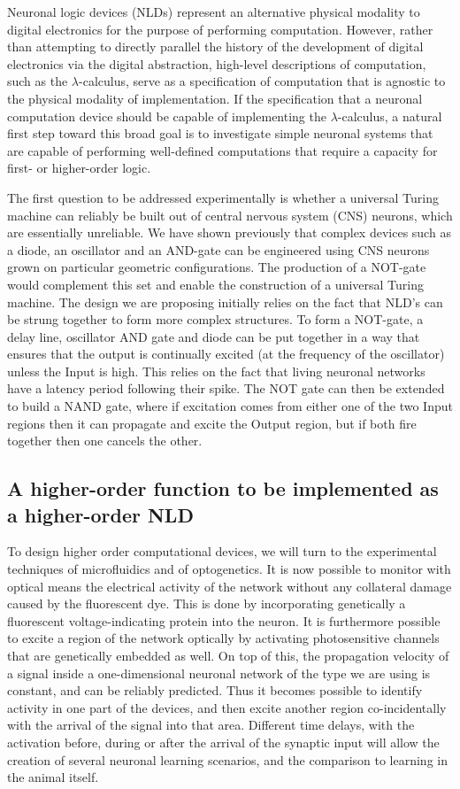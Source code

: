 Neuronal logic devices (NLDs) represent an alternative physical modality
to digital electronics for the purpose of performing computation.
However, rather than attempting to directly parallel the history of the
development of digital electronics via the digital abstraction,
high-level descriptions of computation, such as the
$\lambda$-calculus, serve as a specification
of computation that is agnostic to the physical modality of
implementation. If the specification that a neuronal computation device
should be capable of implementing the
$\lambda$-calculus, a natural first step
toward this broad goal is to investigate simple neuronal systems that
are capable of performing well-defined computations that require a
capacity for first- or higher-order logic.

The first question to be addressed experimentally is whether a universal Turing machine can reliably be built out of central nervous system (CNS) neurons, which are essentially unreliable. We have shown previously that complex devices such as a diode, an oscillator and an AND-gate can be engineered using CNS neurons grown on particular geometric configurations. The production of a NOT-gate would complement this set and enable the construction of a universal Turing machine.
The design we are proposing initially relies on the fact that NLD's can be strung together to form more complex structures. To form a NOT-gate, a delay line, oscillator AND gate and diode can be put together in a way that ensures that the output is continually excited (at the frequency of the oscillator) unless the Input is high. This relies on the fact that living neuronal networks have a latency period following their spike. The NOT gate can then be extended to build a NAND gate, where if excitation comes from either one of the two Input regions then it can propagate and excite the Output region, but if both fire together then one cancels the other.


\subsection{A higher-order function to be implemented as a higher-order
NLD}

To design higher order computational devices, we will turn to the experimental techniques of microfluidics and of optogenetics. 
It is now possible to monitor with optical means the electrical activity of the network without any collateral damage caused by the fluorescent dye. This is done by incorporating genetically a fluorescent voltage-indicating protein into the neuron. It is furthermore possible to excite a region of the network optically by activating photosensitive channels that are genetically embedded as well. On top of this, the propagation velocity of a signal inside a one-dimensional neuronal network of the type we are using is constant, and can be reliably predicted. Thus it becomes possible to identify activity in one part of the devices, and then excite another region co-incidentally with the arrival of the signal into that area. Different time delays, with the activation before, during or after the arrival of the synaptic input will allow the creation of several neuronal learning scenarios, and the comparison to learning in the animal itself.



